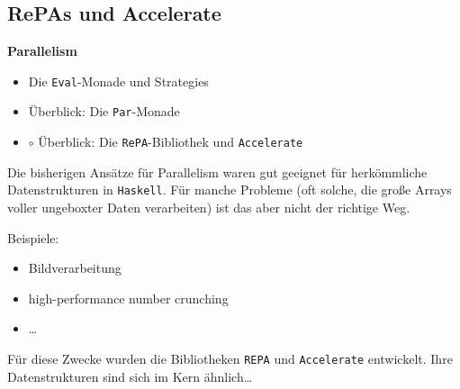 \documentclass{beamer}
\begin{document}

\subsection{RePAs und Accelerate}

\begin{frame}[fragile]

\begin{center}
\Large
\textbf{Parallelism}\normalsize\bigskip
\begin{itemize}
\item Die \texttt{Eval}-Monade und Strategies
\item Überblick: Die \texttt{Par}-Monade
\item $\circ$ Überblick: Die \texttt{RePA}-Bibliothek und \texttt{Accelerate}
\end{itemize}
\end{center}

\end{frame}


\begin{frame}

Die bisherigen Ansätze für Parallelism waren gut geeignet für herkömmliche Datenstrukturen in \texttt{Haskell}. Für manche Probleme (oft solche, die große Arrays voller ungeboxter Daten verarbeiten) ist das aber nicht der richtige Weg.\pause\bigskip

Beispiele:
\begin{itemize}
\item Bildverarbeitung\pause
\item high-performance number crunching\pause
\item \dots
\end{itemize}
\pause

Für diese Zwecke wurden die Bibliotheken \texttt{REPA} und \texttt{Accelerate} entwickelt. Ihre Datenstrukturen sind sich im Kern ähnlich\dots

\end{frame}

\end{document}
